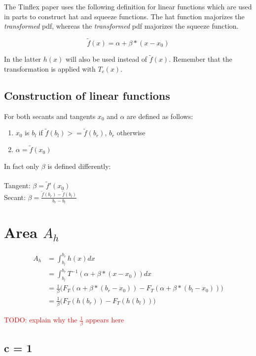 \documentclass[]{article}
\begin{document}
The Tinflex paper uses the following definition for linear functions which are used in parts to construct hat and squeeze functions. The hat function majorizes the \textit{transformed} pdf, whereas the \textit{transformed} pdf majorizes the squeeze function.

\[ \tilde{f}(x) = \alpha + \beta * (x - x_0) \]

In the latter $h(x)$ will also be used instead of $\tilde{f}(x)$.
Remember that the transformation is applied with $T_c(x)$.

\subsection{Construction of linear functions}

For both secants and tangents $x_0$ and $\alpha$ are defined as follows:

\begin{enumerate}
\item $x_0$ is $b_l$ if $\tilde{f}(b_l) >= \tilde{f}(b_r)$, $b_r$ otherwise
\item $\alpha = \tilde{f}(x_0)$
\end{enumerate}

In fact only $\beta$ is defined differently: \\ 
\ \\
Tangent: $\beta = \tilde{f}'(x_0)$ \\ 
Secant:  $\beta = \frac{\tilde{f}(b_r) - \tilde{f}(b_l)}{b_r - b_l}$


\section{Area $A_h$}

\begin{align*}
A_h &= \int_{b_l}^{b_r} h(x) dx \\
&= \int_{b_l}^{b_r} T^{-1}(\alpha + \beta * (x - x_0)) dx \\
&= \frac{1}{\beta} \big( F_T (\alpha + \beta * (b_r - x_0)) - F_T(\alpha + \beta * (b_l - x_0)) \big) \\
&= \frac{1}{\beta} \big( F_T (h(b_r)) - F_T(h(b_l)) \big)
\end{align*}

\textcolor{red}{TODO: explain why the $\frac{1}{\beta}$ appears here}

\subsection{c = 1}
\end{document}
